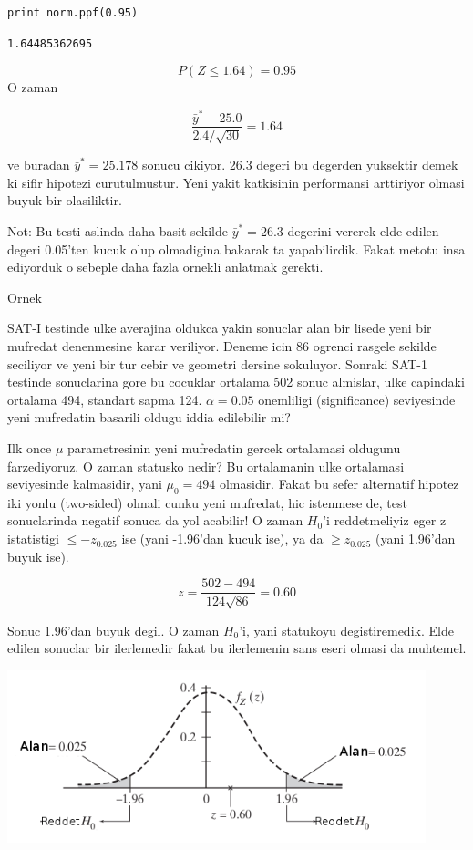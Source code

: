 \documentclass[12pt,fleqn]{article}\usepackage{../common}
\begin{document}
\begin{verbatim}
print norm.ppf(0.95)
\end{verbatim}

\begin{verbatim}
1.64485362695
\end{verbatim}


$$ P(Z \le 1.64)  = 0.95 $$
O zaman 

$$ \frac{\bar{y}^* - 25.0}{2.4 / \sqrt{30}} = 1.64 $$

ve buradan $\bar{y}^* = 25.178$ sonucu cikiyor. 26.3 degeri bu degerden
yuksektir demek ki sifir hipotezi curutulmustur. Yeni yakit katkisinin
performansi arttiriyor olmasi buyuk bir olasiliktir. 

Not: Bu testi aslinda daha basit sekilde $\bar{y}^* = 26.3$ degerini
vererek elde edilen degeri 0.05'ten kucuk olup olmadigina bakarak ta
yapabilirdik. Fakat metotu insa ediyorduk o sebeple daha fazla ornekli
anlatmak gerekti. 

Ornek

SAT-I testinde ulke averajina oldukca yakin sonuclar alan bir lisede yeni
bir mufredat denenmesine karar veriliyor. Deneme icin 86 ogrenci rasgele
sekilde seciliyor ve yeni bir tur cebir ve geometri dersine
sokuluyor. Sonraki SAT-1 testinde sonuclarina gore bu cocuklar ortalama 502
sonuc almislar, ulke capindaki ortalama 494, standart sapma
124. $\alpha=0.05$ onemliligi (significance) seviyesinde yeni mufredatin
basarili oldugu iddia edilebilir mi? 

Ilk once $\mu$ parametresinin yeni mufredatin gercek ortalamasi oldugunu
farzediyoruz. O zaman statusko nedir? Bu ortalamanin ulke ortalamasi
seviyesinde kalmasidir, yani $\mu_0 = 494$ olmasidir. Fakat bu sefer
alternatif hipotez iki yonlu (two-sided) olmali cunku yeni mufredat, hic
istenmese de, test sonuclarinda negatif sonuca da yol acabilir! O zaman
$H_0$'i reddetmeliyiz eger z istatistigi $\le -z_{0.025}$ ise (yani
-1.96'dan kucuk ise), ya da $\ge z_{0.025}$ (yani 1.96'dan buyuk ise). 

$$ z = \frac{502-494}{124\sqrt{86}} = 0.60$$

Sonuc 1.96'dan buyuk degil. O zaman $H_0$'i, yani statukoyu
degistiremedik. Elde edilen sonuclar bir ilerlemedir fakat bu ilerlemenin sans
eseri olmasi da muhtemel.

\includegraphics[height=5cm]{sat1.png}
\end{document}
